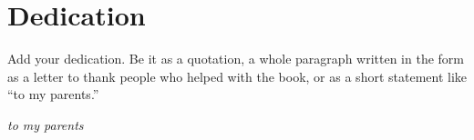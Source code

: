 \thispagestyle{empty}

\chapter{Dedication}

Add your dedication. Be it as a quotation, a whole paragraph written in the form as a letter to thank people who helped with the book, or as a short statement like ``to my parents.''

\textit{to my parents}